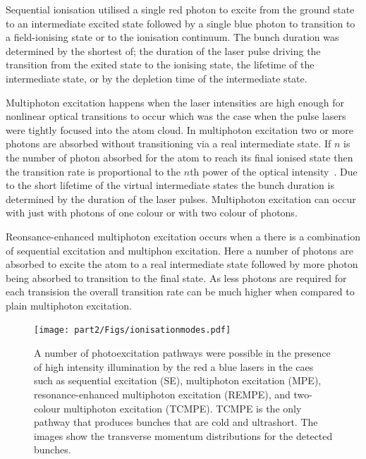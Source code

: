 Sequential ionisation utilised a single red photon to excite from the ground state to an intermediate excited state followed by a single blue photon to transition to a field-ionising state or to the ionisation continuum.
The bunch duration was determined by the shortest of; the duration of the laser pulse driving the transition from the exited state to the ionising state, the lifetime of the intermediate state, or by the depletion time of the intermediate state.

Multiphoton excitation happens when the laser intensities are high enough for nonlinear optical transitions to occur which was the case when the pulse lasers were tightly focused into the atom cloud.
In multiphoton excitation two or more photons are absorbed without transitioning via a real intermediate state.
If $n$ is the number of photon absorbed for the atom to reach its final ionised state then the transition rate is proportional to the $n$th power of the optical intensity~\cite{joachain_atoms_2011}.
Due to the short lifetime of the virtual intermediate states the bunch duration is determined by the duration of the laser pulses.
Multiphoton excitation can occur with just with photons of one colour or with two colour of photons.

Reonsance-enhanced multiphoton excitation occurs when a there is a combination of sequential excitation and multiphon excitation.
Here a number of photons are absorbed to excite the atom to a real intermediate state followed by more photon being absorbed to transition to the final state.
As less photons are required for each transision the overall transition rate can be much higher when compared to plain multiphoton excitation.

\begin{figure}
    \center
    \texttt{[image: part2/Figs/ionisationmodes.pdf]}
    \caption{A number of photoexcitation pathways were possible in the presence of high intensity illumination by the red a blue lasers in the \gls{caes} such as sequential excitation (SE), multiphoton excitation (MPE), resonance-enhanced multiphoton excitation (REMPE), and two-colour multiphoton excitation (TCMPE). TCMPE is the only pathway that produces bunches that are cold and ultrashort. The images show the transverse momentum distributions for the detected bunches.}
    \label{figure:ionisation_modes}
\end{figure}

